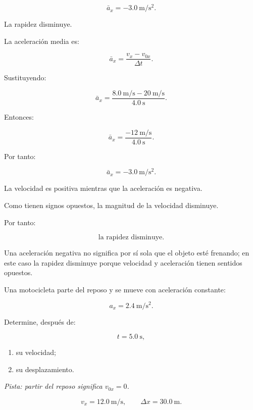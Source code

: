 \begin{respuesta}
\[
\boxed{\bar{a}_x=-\SI{3.0}{\meter\per\second\squared}}.
\]

La rapidez disminuye.
\end{respuesta}

\begin{explicacion}
La aceleración media es:

\[
\bar{a}_x
=
\frac{v_x-v_{0x}}{\Delta t}.
\]

Sustituyendo:

\[
\bar{a}_x
=
\frac{
\SI{8.0}{\meter\per\second}
-
\SI{20}{\meter\per\second}
}{
\SI{4.0}{\second}
}.
\]

Entonces:

\[
\bar{a}_x
=
\frac{-\SI{12}{\meter\per\second}}
{\SI{4.0}{\second}}.
\]

Por tanto:

\[ \boxed{\bar{a}_x=-\SI{3.0}{\meter\per\second\squared}}. \]

La velocidad es positiva mientras que la aceleración es negativa.

Como tienen signos opuestos, la magnitud de la velocidad disminuye.

Por tanto:

\[ \boxed{\text{la rapidez disminuye}}. \]

Una aceleración negativa no significa por sí sola que el objeto esté frenando; en este caso la rapidez disminuye porque velocidad y aceleración tienen sentidos opuestos.
\end{explicacion}


\begin{ejercicio}
Una motocicleta parte del reposo y se mueve con aceleración constante:

\[ a_x=\SI{2.4}{\meter\per\second\squared}. \]

Determine, después de:

\[ t=\SI{5.0}{\second}, \]

\begin{enumerate}[label=\alph*)]
    \item su velocidad;
    \item su desplazamiento.
\end{enumerate}

\textit{Pista: partir del reposo significa \(v_{0x}=0\).}
\end{ejercicio}

\begin{respuesta}
\[
\boxed{v_x=\SI{12.0}{\meter\per\second}},
\qquad
\boxed{\Delta x=\SI{30.0}{\meter}}.
\]
\end{respuesta}

